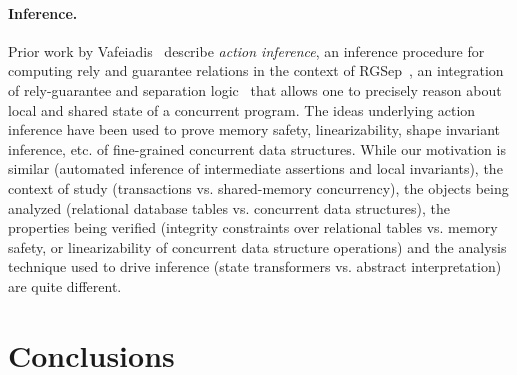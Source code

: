 
\vspace*{-4pt}
\paragraph{Inference.}  Prior work by Vafeiadis~\cite{Vaf10,Vaf10a}
describe \emph{action inference}, an inference procedure for computing
rely and guarantee relations in the context of RGSep~\cite{VP07}, an
integration of rely-guarantee and separation logic~\cite{Rey02} that
allows one to precisely reason about local and shared state of a
concurrent program. The ideas underlying action inference have been
used to prove memory safety, linearizability, shape invariant
inference, etc.  of fine-grained concurrent data structures.  While
our motivation is similar (automated inference of intermediate
assertions and local invariants), the context of study (transactions
vs. shared-memory concurrency), the objects being analyzed (relational
database tables vs. concurrent data structures), the properties being
verified (integrity constraints over relational tables vs. memory
safety, or linearizability of concurrent data structure operations)
and the analysis technique used to drive inference (state transformers
vs. abstract interpretation) are quite different.

\section{Conclusions}
\label{sec:conclusions}

